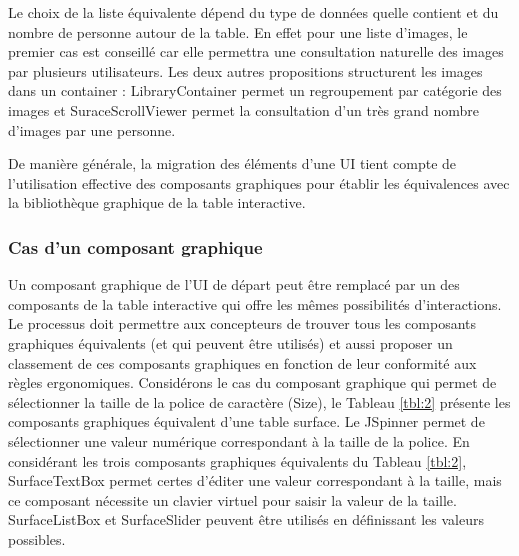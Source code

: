 Le choix de la liste équivalente dépend du type de données quelle contient et du nombre de personne autour de la table. En effet pour une liste d'images, le premier
cas est conseillé car elle permettra une consultation naturelle des images par plusieurs
utilisateurs. Les deux autres propositions structurent les images dans un container :
LibraryContainer permet un regroupement par catégorie des images et SuraceScrollViewer permet la consultation d'un très grand nombre d'images par une personne.

De manière générale, la migration des éléments d'une UI tient compte de l'utilisation
effective des composants graphiques pour établir les équivalences avec la bibliothèque
graphique de la table interactive.

\subsubsection{	Cas d'un composant graphique}

Un composant graphique de l'UI de départ peut être remplacé par un des composants
de la table interactive qui offre les mêmes possibilités d'interactions. Le processus doit
permettre aux concepteurs de trouver tous les composants graphiques équivalents (et qui
peuvent être utilisés) et aussi proposer un classement de ces composants graphiques en
fonction de leur conformité aux règles ergonomiques. Considérons le cas du composant
graphique qui permet de sélectionner la taille de la police de caractère (Size), le Tableau \ref{tbl:2} présente les composants graphiques équivalent d'une table surface. Le JSpinner
permet de sélectionner une valeur numérique correspondant à la taille de la police. En
considérant les trois composants graphiques équivalents du Tableau \ref{tbl:2}, SurfaceTextBox
permet certes d'éditer une valeur correspondant à la taille, mais ce composant nécessite
un clavier virtuel pour saisir la valeur de la taille. SurfaceListBox et SurfaceSlider
peuvent être utilisés en définissant les valeurs possibles.

